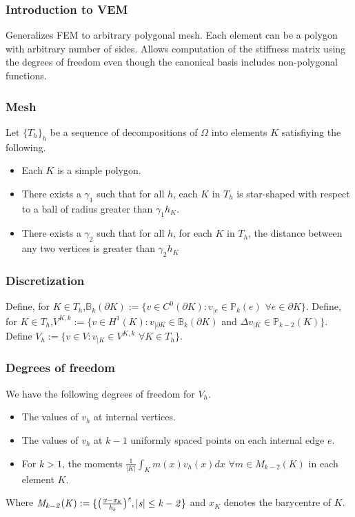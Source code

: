 \documentclass{beamer}
\begin{document}
\begin{frame}\frametitle{Introduction to VEM}
Generalizes FEM to arbitrary polygonal mesh.
\linebreak\linebreak
Each element can be a polygon with arbitrary number of sides.
\linebreak\linebreak
Allows computation of the stiffness matrix using the degrees of freedom even though the canonical basis includes non-polygonal functions.
\end{frame}
\begin{frame}
\frametitle{Mesh}
Let $\{T_h\}_h$ be a sequence of decompositions of $\Omega$ into elements $K$ satisfiying the following.
\begin{itemize}
\item Each $K$ is a simple polygon.
\item There exists a $\gamma_1$ such that for all $h$, each $K$ in $T_h$ is star-shaped with respect to a ball of radius greater than $\gamma_1 h_K$.
\item There exists a $\gamma_2$ such that for all $h$, for each $K$ in $T_h$, the distance between any two vertices is greater than $\gamma_2 h_K$
\end{itemize}
\end{frame}
\begin{frame}
\frametitle{Discretization}
Define, for $K\in T_h$,\linebreak $\mathbb{B}_k(\partial K):=\{v\in C^0(\partial K):v_{|e}\in\mathbb{P}_k(e)$ $\forall e \in \partial K\}$.
\linebreak\linebreak
Define, for $K\in T_h$,\linebreak $V^{K,k}:=\{v\in H^1(K) : v_{|\partial K} \in \mathbb{B}_k(\partial K)$ and $ \Delta v_{|K} \in \mathbb{P}_{k-2}(K)\}$.
\linebreak\linebreak
Define $V_h:=\{v\in V : v_{|K}\in V^{K,k}$ $\forall K \in T_h \}$.
\linebreak\linebreak
\noindent{}
\end{frame}

\begin{frame}
\frametitle{Degrees of freedom}
We have the following degrees of freedom for $V_h$.
\begin{itemize}
\item The values of $v_h$ at internal vertices.
\item The values of $v_h$ at $k-1$ uniformly spaced points on each internal edge $e$.
\item For $k>1$, the moments $\frac{1}{|K|}\int_K m(x) v_h(x) dx$ $\forall m \in M_{k-2}(K)$ in each element $K$.
\end{itemize}
Where $\it{M}_{k-2}(K):=\{ \big(\frac{x-x_{K}}{h_{k}}\big)^{s}, |s|\leq k-2 \} $ and $x_{K}$ denotes the barycentre of $K$.
\end{frame}
\end{document}
